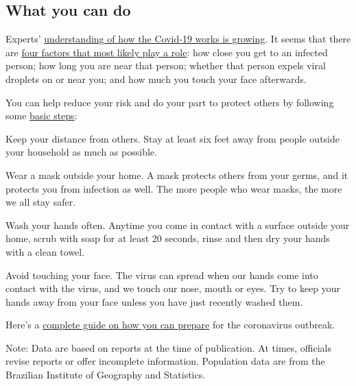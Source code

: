\hypertarget{what-you-can-do}{%
\subsection{What you can do}\label{what-you-can-do}}

Experts'
\href{https://www.nytimes3xbfgragh.onion/2020/06/02/health/coronavirus-profile-covid.html}{understanding
of how the Covid-19 works is growing}. It seems that there are
\href{https://www.nytimes3xbfgragh.onion/article/coronavirus-how-it-spreads.html}{four
factors that most likely play a role}: how close you get to an infected
person; how long you are near that person; whether that person expels
viral droplets on or near you; and how much you touch your face
afterwards.

You can help reduce your risk and do your part to protect others by
following some
\href{https://www.nytimes3xbfgragh.onion/article/prepare-for-coronavirus.html}{basic
steps}:

Keep your distance from others. Stay at least six feet away from people
outside your household as much as possible.

Wear a mask outside your home. A mask protects others from your germs,
and it protects you from infection as well. The more people who wear
masks, the more we all stay safer.

Wash your hands often. Anytime you come in contact with a surface
outside your home, scrub with soap for at least 20 seconds, rinse and
then dry your hands with a clean towel.

Avoid touching your face. The virus can spread when our hands come into
contact with the virus, and we touch our nose, mouth or eyes. Try to
keep your hands away from your face unless you have just recently washed
them.

Here's a
\href{https://www.nytimes3xbfgragh.onion/interactive/2020/world/coronavirus-tips-advice.html}{complete
guide on how you can prepare} for the coronavirus outbreak.

Note: Data are based on reports at the time of publication. At times,
officials revise reports or offer incomplete information. Population
data are from the Brazilian Institute of Geography and Statistics.

